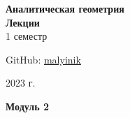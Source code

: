 



\begin{titlepage}
    \vspace*{0pt}
    \vfill
    \centering
    \Huge\textbf{Аналитическая геометрия} \\[7pt]
    \Large\textbf{Лекции} \\
    \large 1 семестр \\ 
    \vfill
    \begin{flushright}
        \normalsize GitHub: \href{https://github.com/malyinik}{malyinik} \\
    \end{flushright}
    \normalsize 2023 г.
\end{titlepage}
\newpage

\tableofcontents
\newpage


\newpage
\zerocounter

\newpage
\zerocounter

\newpage
\zerocounter

\newpage
\zerocounter

\newpage
\zerocounter
\begin{center}
\large{\textbf{Модуль 2}}
\end{center}

\newpage
\zerocounter

\newpage
\zerocounter





